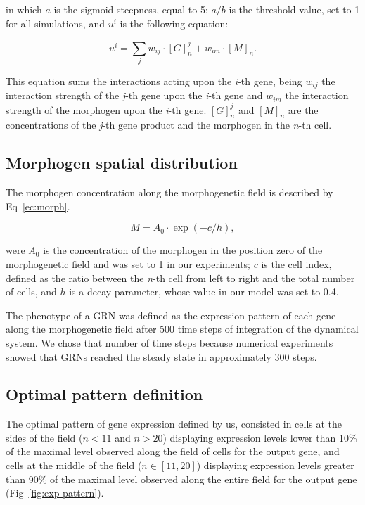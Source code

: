 \documentclass[10pt,letterpaper]{article}
\begin{document}
in which $a$ is the sigmoid steepness, equal to 5; $a/b$ is the threshold value,
set to 1 for all simulations, and $u^i$ is the following equation:

\begin{equation}
 u^i = \sum_j w_{ij} \cdot [G]^j_n + w_{im} \cdot [M]_n.
 \label{ec:mat-sum}
\end{equation}

This equation sums the interactions acting upon the \emph{i}-th gene, being 
$w_{ij}$ the interaction strength of the \emph{j}-th gene upon the \emph{i}-th 
gene and $w_{im}$ the interaction strength of the morphogen upon the \emph{i}-th
gene. $[G]^j_n$ and $[M]_n$ are the concentrations of the \emph{j}-th gene 
product and the morphogen in the \emph{n}-th cell.

\subsection*{Morphogen spatial distribution}

The morphogen concentration along the morphogenetic field is described by 
Eq~\ref{ec:morph}.

\begin{equation}
 M = A_0 \cdot \exp(-c/h),
 \label{ec:morph}
\end{equation}

were $A_0$ is the concentration of the morphogen in the position zero of the 
morphogenetic field and was set to 1 in our experiments; $c$ is the cell index, 
defined as the ratio between the \emph{n}-th cell from left to right and the 
total number of cells, and $h$ is a decay parameter, whose value in our model 
was set to 0.4.

The phenotype of a GRN was defined as the expression pattern of each gene along 
the morphogenetic field after 500 time steps of integration of the dynamical 
system. We chose that number of time steps because numerical experiments showed 
that GRNs reached the steady state in approximately 300 steps.

\subsection*{Optimal pattern definition}

The optimal pattern of gene expression defined by us, consisted in cells at the 
sides of the field ($n<11$ and $n>20$) displaying expression levels lower than 
10\% of the maximal level observed along the field of cells for the output gene,
and cells at the middle of the field ($n ∈ [11,20]$) displaying expression 
levels greater than 90\% of the maximal level observed along the entire field 
for the output gene (Fig~\ref{fig:exp-pattern}).
\end{document}
